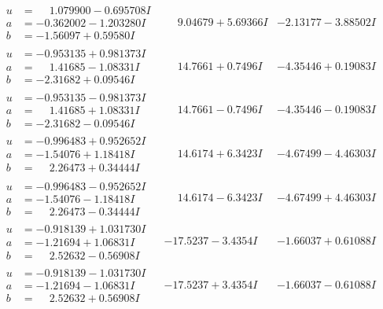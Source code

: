 \documentclass[1p]{elsarticle_modified}
\theoremstyle{definition}
\begin{document}
$$\begin{array}{c|c|c}
\begin{aligned}
u &= \phantom{-}1.079900 - 0.695708 I \\
a &= -0.362002 - 1.203280 I \\
b &= -1.56097 + 0.59580 I\end{aligned}
 & \phantom{-}9.04679 + 5.69366 I & -2.13177 - 3.88502 I \\ \hline\begin{aligned}
u &= -0.953135 + 0.981373 I \\
a &= \phantom{-}1.41685 - 1.08331 I \\
b &= -2.31682 + 0.09546 I\end{aligned}
 & \phantom{-}14.7661 + 0.7496 I & -4.35446 + 0.19083 I \\ \hline\begin{aligned}
u &= -0.953135 - 0.981373 I \\
a &= \phantom{-}1.41685 + 1.08331 I \\
b &= -2.31682 - 0.09546 I\end{aligned}
 & \phantom{-}14.7661 - 0.7496 I & -4.35446 - 0.19083 I \\ \hline\begin{aligned}
u &= -0.996483 + 0.952652 I \\
a &= -1.54076 + 1.18418 I \\
b &= \phantom{-}2.26473 + 0.34444 I\end{aligned}
 & \phantom{-}14.6174 + 6.3423 I & -4.67499 - 4.46303 I \\ \hline\begin{aligned}
u &= -0.996483 - 0.952652 I \\
a &= -1.54076 - 1.18418 I \\
b &= \phantom{-}2.26473 - 0.34444 I\end{aligned}
 & \phantom{-}14.6174 - 6.3423 I & -4.67499 + 4.46303 I \\ \hline\begin{aligned}
u &= -0.918139 + 1.031730 I \\
a &= -1.21694 + 1.06831 I \\
b &= \phantom{-}2.52632 - 0.56908 I\end{aligned}
 & -17.5237 - 3.4354 I & -1.66037 + 0.61088 I \\ \hline\begin{aligned}
u &= -0.918139 - 1.031730 I \\
a &= -1.21694 - 1.06831 I \\
b &= \phantom{-}2.52632 + 0.56908 I\end{aligned}
 & -17.5237 + 3.4354 I & -1.66037 - 0.61088 I \\ \hline\begin{aligned}

\end{aligned}
\end{array}$$
\end{document}
